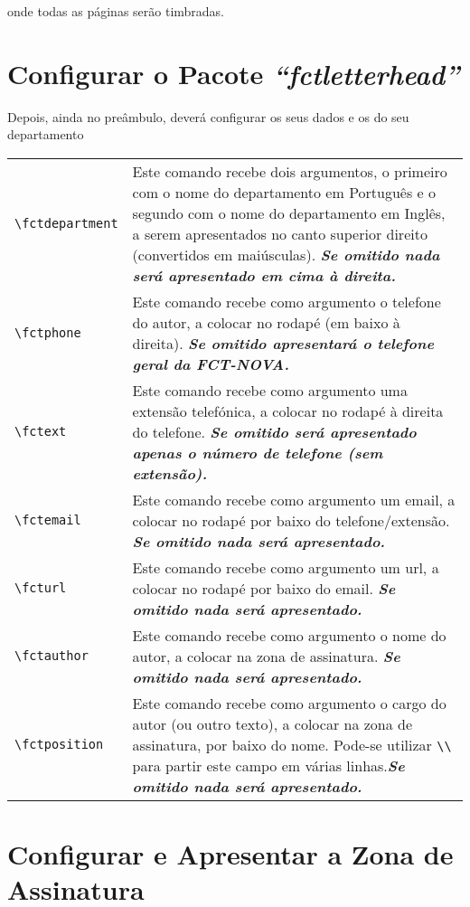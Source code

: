 \documentclass[a4paper,11pt]{article}
\newcommand*{\thePackage}{\emph{“fctletterhead”}}
\begin{document}
\noindent onde todas as páginas serão timbradas.

\section{Configurar o Pacote \thePackage}

Depois, ainda no preâmbulo, deverá configurar os seus dados e os do seu departamento

\bgroup
  \renewcommand{\arraystretch}{1.5}
  \begin{xltabular}{\textwidth}{lX}
    \verb+\fctdepartment+ & Este comando recebe dois argumentos, o primeiro com o nome do departamento em Português e o segundo com o nome do departamento em Inglês, a serem apresentados no canto superior direito (convertidos em maiúsculas).  \textbf{\textsl{Se omitido nada será apresentado em cima à direita.}}\\
    \verb+\fctphone+   & Este comando recebe como argumento o telefone do autor, a colocar no rodapé (em baixo à direita). \textbf{\textsl{Se omitido apresentará o telefone geral da FCT-NOVA.}}\\
    \verb+\fctext+   & Este comando recebe como argumento uma extensão telefónica, a colocar no rodapé à direita do telefone. \textbf{\textsl{Se omitido será apresentado apenas o número de telefone (sem extensão).}}\\
    \verb+\fctemail+  & Este comando recebe como argumento um email, a colocar no rodapé por baixo do telefone/extensão. \textbf{\textsl{Se omitido nada será apresentado.}}\\
    \verb+\fcturl+   & Este comando recebe como argumento um url, a colocar no rodapé por baixo do email. \textbf{\textsl{Se omitido nada será apresentado.}}\\
    \verb+\fctauthor+     & Este comando recebe como argumento o nome do autor, a colocar na zona de assinatura.  \textbf{\textsl{Se omitido nada será apresentado.}}\\
    \verb+\fctposition+   & Este comando recebe como argumento o cargo do autor (ou outro texto), a colocar na zona de assinatura, por baixo do nome.  Pode-se utilizar \verb+\\+ para partir este campo em várias linhas.\textbf{\textsl{Se omitido nada será apresentado.}}\\
  \end{xltabular}
\egroup

\section{Configurar e Apresentar a Zona de Assinatura}
\end{document}
